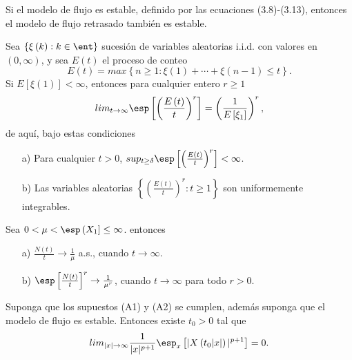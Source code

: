 \begin{Lema}\label{Lema3.1}
Si el modelo de flujo es estable, definido por las ecuaciones
(3.8)-(3.13), entonces el modelo de flujo retrasado tambi\'en es
estable.
\end{Lema}

\begin{Lema}\label{Lema.5.2.Gut}
Sea $\left\{\xi\left(k\right):k\in\ent\right\}$ sucesi\'on de
variables aleatorias i.i.d. con valores en
$\left(0,\infty\right)$, y sea $E\left(t\right)$ el proceso de
conteo
\[E\left(t\right)=max\left\{n\geq1:\xi\left(1\right)+\cdots+\xi\left(n-1\right)\leq t\right\}.\]
Si $E\left[\xi\left(1\right)\right]<\infty$, entonces para
cualquier entero $r\geq1$
\begin{equation}
lim_{t\rightarrow\infty}\esp\left[\left(\frac{E\left(t\right)}{t}\right)^{r}\right]=\left(\frac{1}{E\left[\xi_{1}\right]}\right)^{r},
\end{equation}
de aqu\'i, bajo estas condiciones
\begin{itemize}
\item[a)] Para cualquier $t>0$,
$sup_{t\geq\delta}\esp\left[\left(\frac{E\left(t\right)}{t}\right)^{r}\right]<\infty$.

\item[b)] Las variables aleatorias
$\left\{\left(\frac{E\left(t\right)}{t}\right)^{r}:t\geq1\right\}$
son uniformemente integrables.
\end{itemize}
\end{Lema}

\begin{Teo}\label{Tma.5.1.Gut} Sea
$0<\mu<\esp\left(X_{1}\right]\leq\infty$. entonces

\begin{itemize}
\item[a)] $\frac{N\left(t\right)}{t}\rightarrow\frac{1}{\mu}$
a.s., cuando $t\rightarrow\infty$.


\item[b)]$\esp\left[\frac{N\left(t\right)}{t}\right]^{r}\rightarrow\frac{1}{\mu^{r}}$,
cuando $t\rightarrow\infty$ para todo $r>0$.
\end{itemize}
\end{Teo}


\begin{Prop}\label{Prop.5.1}
Suponga que los supuestos (A1) y (A2) se cumplen, adem\'as suponga
que el modelo de flujo es estable. Entonces existe $t_{0}>0$ tal
que
\begin{equation}\label{Eq.Prop.5.1}
lim_{|x|\rightarrow\infty}\frac{1}{|x|^{p+1}}\esp_{x}\left[|X\left(t_{0}|x|\right)|^{p+1}\right]=0.
\end{equation}

\end{Prop}


